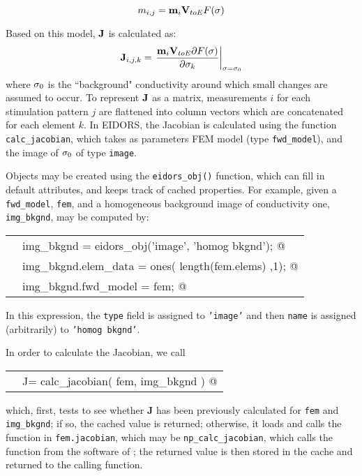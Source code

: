 \documentclass[12pt]{iopart}
\makeatletter
\newcommand{\CODEstart}{\medskip\begin{tabular}{ll}}
\newcommand{\CN}{\tt\scriptsize} %
\newcommand{\CC}{&\small\verb@}   % start code
\newcommand{\CODEend}{\end{tabular}\medskip}
\makeatother
\begin{document}
\begin{equation}
m_{i,j} = {\bf m}_{i} {\bf V}_{toE} F({\bf \sigma})
\end{equation}

Based on this model, $\bf J$ is calculated as:
\begin{equation}
{\bf J}_{i,j,k} = \left.\frac{
 {\bf m}_{i} {\bf V}_{toE}{\partial}F({\bf \sigma})
}{
{\partial}{\bf \sigma}_k
}
\right|_{
   {\bf \sigma} = {\bf \sigma}_0 
}
\end{equation}
where ${\bf \sigma}_0$ is the ``background"
conductivity around which small changes are assumed to occur.
To represent $\bf J$ as a matrix, measurements $i$ for each stimulation
pattern $j$ are flattened into column vectors which are concatenated
for each element $k$.
In EIDORS, the Jacobian is calculated using the function
{\tt calc\_jacobian},
which takes as parameters FEM model (type {\tt fwd\_model}),
and the image of ${\bf \sigma}_0$ 
of type {\tt image}.

Objects may be created using the {\tt eidors\_obj()}
function, which can fill in default attributes, and 
keeps track of cached properties.
For example, given a {\tt fwd\_model}, {\tt fem}, and
a homogeneous background image of conductivity one,
{\tt img\_bkgnd}, may be computed by:

\CODEstart
\CN    \CC img_bkgnd           = eidors_obj('image', 'homog bkgnd'); @\\[-3pt]
\CN    \CC img_bkgnd.elem_data = ones( length(fem.elems) ,1); @\\[-3pt]
\CN    \CC img_bkgnd.fwd_model = fem; @\\[-3pt]
\CODEend

In this expression, the {\tt type} field is assigned
to {\tt 'image'} and then {\tt name} is assigned
(arbitrarily) to {\tt 'homog bkgnd'}.

In order to calculate the Jacobian, we call

\CODEstart
\CN    \CC J= calc_jacobian( fem, img_bkgnd ) @\\[-3pt]
\CODEend

which, first, tests to see whether {\bf J} has been previously
calculated for {\tt fem} and {\tt img\_bkgnd}; if
so, the cached value is returned; otherwise,
it loads and calls the function in {\tt fem.jacobian},
which may be {\tt np\_calc\_jacobian}, which 
calls the function from the software of
\cite{Polydorides_and_Lionheart_2002}; the returned
value is then stored in the cache and returned to the
calling function.
\end{document}

